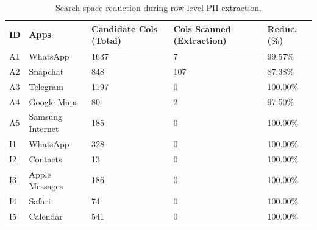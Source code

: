 \begin{table}[th]
\centering
\caption{Search space reduction during row-level PII extraction.}
\label{tab:search_space_reduction}
\small
\begin{tabular}{|l|l|p{1.3cm}|p{1.7cm}|p{1.0cm}|}
\hline
\textbf{ID} & \textbf{Apps} & \textbf{Candidate Cols (Total)} & \textbf{Cols Scanned (Extraction)} & \textbf{Reduc. (\%)} \\
\hline
A1 & WhatsApp & 1637 & 7 & 99.57\% \\
\hline
A2 & Snapchat & 848 & 107 & 87.38\% \\
\hline
A3 & Telegram & 1197 & 0 & 100.00\% \\
\hline
A4 & Google Maps & 80 & 2 & 97.50\% \\
\hline
A5 & Samsung Internet & 185 & 0 & 100.00\% \\
\hline
I1 & WhatsApp & 328 & 0 & 100.00\% \\
\hline
I2 & Contacts & 13 & 0 & 100.00\% \\
\hline
I3 & Apple Messages & 186 & 0 & 100.00\% \\
\hline
I4 & Safari & 74 & 0 & 100.00\% \\
\hline
I5 & Calendar & 541 & 0 & 100.00\% \\
\hline
\end{tabular}
\end{table}